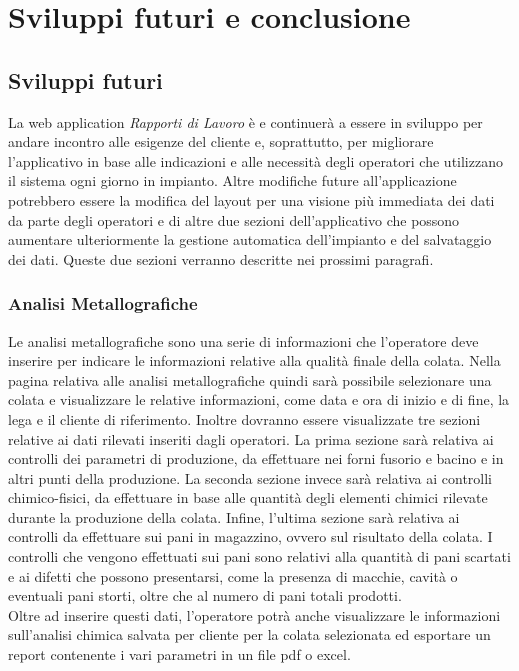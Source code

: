 \chapter{Sviluppi futuri e conclusione}
  \label{chapter_sviluppi_futuri_conclusione}
  \section{Sviluppi futuri}
  La web application \textit{Rapporti di Lavoro} è e continuerà a essere in sviluppo per andare incontro alle esigenze
  del cliente e, soprattutto, per migliorare l'applicativo in base alle indicazioni e alle necessità degli operatori
  che utilizzano il sistema ogni giorno in impianto. Altre modifiche future all'applicazione potrebbero essere la modifica
  del layout per una visione più immediata dei dati da parte degli operatori e di altre due sezioni dell'applicativo che 
  possono aumentare ulteriormente la gestione automatica dell'impianto e del salvataggio dei dati. Queste due sezioni verranno
  descritte nei prossimi paragrafi. 

  \subsection{Analisi Metallografiche}
  Le analisi metallografiche sono una serie di informazioni che l'operatore deve inserire per indicare le informazioni
  relative alla qualità finale della colata. Nella pagina relativa alle analisi metallografiche quindi sarà possibile
  selezionare una colata e visualizzare le relative informazioni, come data e ora di inizio e di fine, la lega e il
  cliente di riferimento. Inoltre dovranno essere visualizzate tre sezioni relative ai dati rilevati inseriti dagli operatori.
  La prima sezione sarà relativa ai controlli dei parametri di produzione, da effettuare nei forni fusorio e bacino e in
  altri punti della produzione. La seconda sezione invece sarà relativa ai controlli chimico-fisici, da effettuare in base
  alle quantità degli elementi chimici rilevate durante la produzione della colata. Infine, l'ultima sezione sarà relativa
  ai controlli da effettuare sui pani in magazzino, ovvero sul risultato della colata. I controlli che vengono effettuati sui pani
  sono relativi alla quantità di pani scartati e ai difetti che possono presentarsi, come la presenza di macchie, cavità o
  eventuali pani storti, oltre che al numero di pani totali prodotti.\\
  Oltre ad inserire questi dati, l'operatore potrà anche visualizzare le informazioni sull'analisi chimica salvata per cliente
  per la colata selezionata ed esportare un report contenente i vari parametri in un file pdf o excel.  

